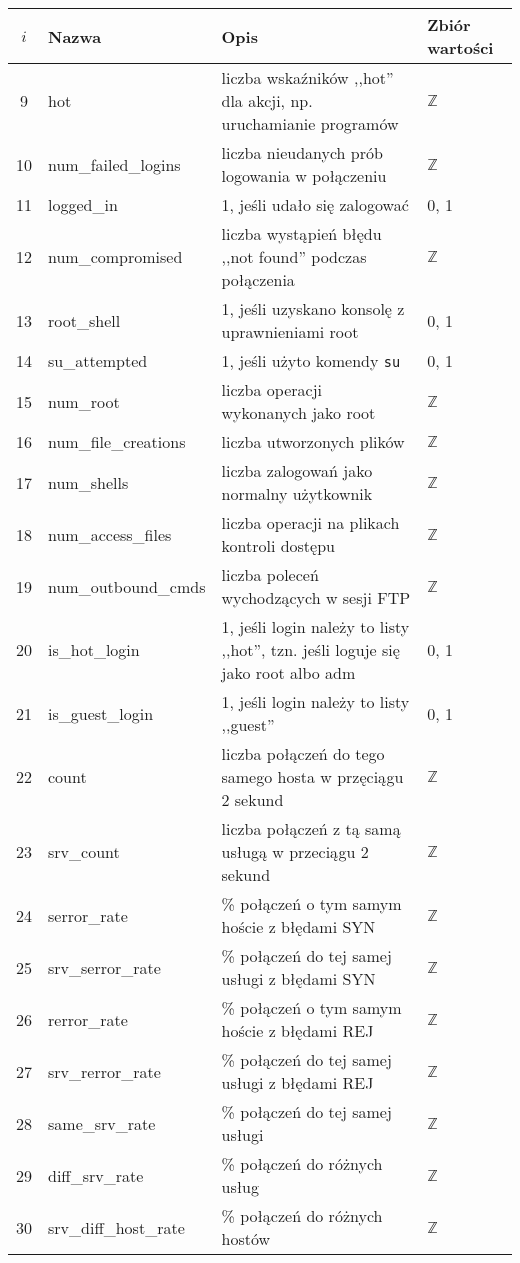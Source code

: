 \documentclass[a4paper, 12pt]{article}
\begin{document}
\begin{tabular}{ | c | l | p{} | p{} | } \hline
$i$ & Nazwa & Opis & Zbiór wartości \\ \hline
9      & hot & liczba wskaźników ,,hot'' dla akcji, np. uruchamianie programów & $\mathbb{Z}$ \\ \hline
10      & num\_failed\_logins  & liczba nieudanych prób logowania w połączeniu & $\mathbb{Z}$ \\ \hline
11      & logged\_in  & 1, jeśli udało się zalogować &  0, 1 \\ \hline
12      & num\_compromised & liczba wystąpień błędu ,,not found'' podczas połączenia &  $\mathbb{Z}$ \\ \hline
13      & root\_shell  & 1, jeśli uzyskano konsolę z uprawnieniami root  &  0, 1 \\ \hline
14      & su\_attempted  & 1, jeśli użyto komendy \texttt{su} &  0, 1 \\ \hline
15      & num\_root  & liczba operacji wykonanych jako root  & $\mathbb{Z}$ \\ \hline
16      & num\_file\_creations  & liczba utworzonych plików  & $\mathbb{Z}$ \\ \hline
17      & num\_shells  & liczba zalogowań jako normalny użytkownik & $\mathbb{Z}$ \\ \hline
18      & num\_access\_files  & liczba operacji na plikach kontroli dostępu & $\mathbb{Z}$ \\ \hline
19      & num\_outbound\_cmds & liczba poleceń wychodzących w sesji FTP & $\mathbb{Z}$ \\ \hline
20      & is\_hot\_login  & 1, jeśli login należy to listy ,,hot'', tzn. jeśli loguje się jako root albo adm &  0, 1 \\ \hline
21      & is\_guest\_login  & 1, jeśli login należy to listy ,,guest'' &  0, 1 \\ \hline
22     & count & liczba połączeń do tego samego hosta w przęciągu 2 sekund & $\mathbb{Z}$ \\ \hline
23      & srv\_count   & liczba połączeń z tą samą usługą w przeciągu 2 sekund &  $\mathbb{Z}$ \\ \hline
24      & serror\_rate        & \% połączeń o tym samym hoście z błędami SYN  & $\mathbb{Z}$ \\ \hline
25      & srv\_serror\_rate   & \% połączeń do tej samej usługi z błędami SYN & $\mathbb{Z}$ \\ \hline
26      & rerror\_rate        & \% połączeń o tym samym hoście z błędami REJ   & $\mathbb{Z}$ \\ \hline
27      & srv\_rerror\_rate   & \% połączeń do tej samej usługi z błędami REJ  & $\mathbb{Z}$ \\ \hline
28      & same\_srv\_rate     & \% połączeń do tej samej usługi  &  $\mathbb{Z}$ \\ \hline
29      & diff\_srv\_rate     & \% połączeń do różnych usług &  $\mathbb{Z}$ \\ \hline  
30      & srv\_diff\_host\_rate   & \% połączeń do różnych hostów   & $\mathbb{Z}$ \\ \hline
\end{tabular}
\end{document}
